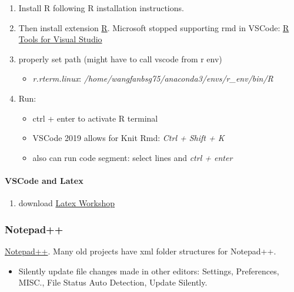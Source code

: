 \documentclass[]{article}
\providecommand{\tightlist}{%
  \setlength{\itemsep}{0pt}\setlength{\parskip}{0pt}}
\let\oldparagraph\paragraph
\renewcommand{\paragraph}[1]{\oldparagraph{#1}\mbox{}}
\begin{document}
\begin{enumerate}
\def\labelenumi{\arabic{enumi}.}
\tightlist
\item
  Install R following R installation instructions.
\item
  Then install extension
  \href{https://marketplace.visualstudio.com/items?itemName=Ikuyadeu.r}{R}.
  Microsoft stopped supporting rmd in VSCode:
  \href{https://github.com/microsoft/RTVS}{R Tools for Visual Studio}
\item
  properly set path (might have to call vscode from r env)

  \begin{itemize}
  \tightlist
  \item
    \emph{r.rterm.linux}:
    \emph{/home/wangfanbsg75/anaconda3/envs/r\_env/bin/R}
  \end{itemize}
\item
  Run:

  \begin{itemize}
  \tightlist
  \item
    ctrl + enter to activate R terminal
  \item
    VSCode 2019 allows for Knit Rmd: \emph{Ctrl + Shift + K}
  \item
    also can run code segment: select lines and \emph{ctrl + enter}
  \end{itemize}
\end{enumerate}

\hypertarget{vscode-and-latex}{%
\paragraph{VSCode and Latex}\label{vscode-and-latex}}

\begin{enumerate}
\def\labelenumi{\arabic{enumi}.}
\tightlist
\item
  download
  \href{https://marketplace.visualstudio.com/items?itemName=James-Yu.latex-workshop}{Latex
  Workshop}
\end{enumerate}

\hypertarget{notepad}{%
\subsubsection{Notepad++}\label{notepad}}

\href{https://notepad-plus-plus.org/downloads/v7.8.2/}{Notepad++}. Many
old projects have xml folder structures for Notepad++.

\begin{itemize}
\tightlist
\item
  Silently update file changes made in other editors: Settings,
  Preferences, MISC., File Status Auto Detection, Update Silently.
\end{itemize}
\end{document}
